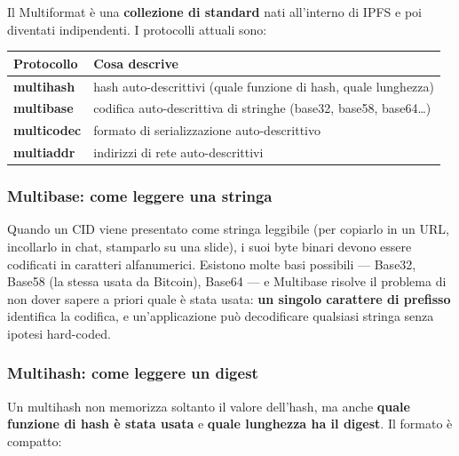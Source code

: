 \documentclass[
  italian,
  openany]{book}
\newcounter{none} %
\begin{document}
Il Multiformat è una \textbf{collezione di standard} nati all'interno di
IPFS e poi diventati indipendenti. I protocolli attuali sono:

{\def\LTcaptype{none} %
\begin{longtable}[]{@{}
  >{\raggedright\arraybackslash}p{}
  >{\raggedright\arraybackslash}p{}@{}}
\toprule\noalign{}
\begin{minipage}[b]{\linewidth}\raggedright
Protocollo
\end{minipage} & \begin{minipage}[b]{\linewidth}\raggedright
Cosa descrive
\end{minipage} \\
\midrule\noalign{}
\endhead
\bottomrule\noalign{}
\endlastfoot
\textbf{multihash} & hash auto-descrittivi (quale funzione di hash,
quale lunghezza) \\
\textbf{multibase} & codifica auto-descrittiva di stringhe (base32,
base58, base64\ldots) \\
\textbf{multicodec} & formato di serializzazione auto-descrittivo \\
\textbf{multiaddr} & indirizzi di rete auto-descrittivi \\
\end{longtable}
}

\subsubsection{Multibase: come leggere una
stringa}\label{multibase-come-leggere-una-stringa}

Quando un CID viene presentato come stringa leggibile (per copiarlo in
un URL, incollarlo in chat, stamparlo su una slide), i suoi byte binari
devono essere codificati in caratteri alfanumerici. Esistono molte basi
possibili --- Base32, Base58 (la stessa usata da Bitcoin), Base64 --- e
Multibase risolve il problema di non dover sapere a priori quale è stata
usata: \textbf{un singolo carattere di prefisso} identifica la codifica,
e un'applicazione può decodificare qualsiasi stringa senza ipotesi
hard-coded.

\subsubsection{Multihash: come leggere un
digest}\label{multihash-come-leggere-un-digest}

Un multihash non memorizza soltanto il valore dell'hash, ma anche
\textbf{quale funzione di hash è stata usata} e \textbf{quale lunghezza
ha il digest}. Il formato è compatto:
\end{document}

